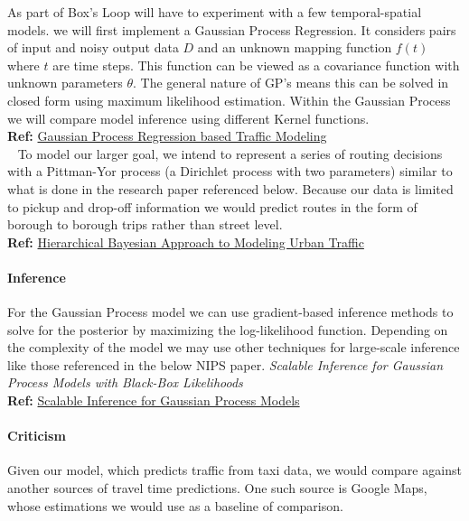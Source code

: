 \documentclass{article}
\begin{document}
As part of Box's Loop will have to experiment with a few temporal-spatial models. we will first implement a Gaussian Process Regression. It considers pairs of input and noisy output data $D$ and an unknown mapping function $f(t)$ where $t$ are time steps. This function can be viewed as a covariance function with unknown parameters $\theta$. The general nature of GP's means this can be solved in closed form using maximum likelihood estimation. Within the Gaussian Process we will compare model inference using different Kernel functions. \\
\textbf{Ref:} 
\href{http://www.synchromedia.ca/system/files/1570265950.pdf}{Gaussian Process Regression based Traffic Modeling}\\
\ \newline
To model our larger goal, we intend to represent a series of routing decisions with a Pittman-Yor process (a Dirichlet process with two parameters) similar to what is done in the research paper referenced below. Because our data is limited to pickup and drop-off information we would predict routes in the form of borough to borough trips rather than street level.\\
\textbf{Ref:} 
\href{http://web.mit.edu/jaillet/www/general/IAT2012.pdf}{Hierarchical Bayesian Approach to Modeling Urban Traffic}

\paragraph{Inference}
For the Gaussian Process model we can use gradient-based inference methods to solve for the posterior by maximizing the log-likelihood function. Depending on the complexity of the model we may use other techniques for large-scale inference like those referenced in the below NIPS paper. \textit{Scalable Inference for Gaussian Process Models with Black-Box Likelihoods}\\
\textbf{Ref:} 
\href{https://papers.nips.cc/paper/5665-scalable-inference-for-gaussian-process-models-with-black-box-likelihoods.pdf}{Scalable Inference for Gaussian Process Models}

\paragraph{Criticism}
Given our model, which predicts traffic from taxi data, we would compare against another sources of travel time predictions. One such source is Google Maps, whose estimations we would use as a baseline of comparison.




\end{document}
